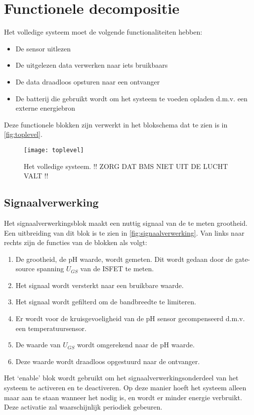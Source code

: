 \section{Functionele decompositie}
Het volledige systeem moet de volgende functionaliteiten hebben:

\begin{itemize}
    \item De sensor uitlezen
    \item De uitgelezen data verwerken naar iets bruikbaars
    \item De data draadloos opsturen naar een ontvanger
    \item De batterij die gebruikt wordt om het systeem te voeden opladen d.m.v. een externe energiebron
\end{itemize}
Deze functionele blokken zijn verwerkt in het blokschema dat te zien is in \autoref{fig:toplevel}.

\begin{figure}[ht]
    \centering
    \texttt{[image: toplevel]}
    \caption{Het volledige systeem. !! ZORG DAT BMS NIET UIT DE LUCHT VALT !!} 
    \label{fig:toplevel}
\end{figure}

\subsection{Signaalverwerking}
Het signaalverwerkingsblok maakt een nuttig signaal van de te meten grootheid. Een uitbreiding van dit blok is te zien in \autoref{fig:signaalverwerking}.
Van links naar rechts zijn de functies van de blokken als volgt:
\begin{enumerate}
    \item De grootheid, de pH waarde, wordt gemeten. Dit wordt gedaan door de gate-source spanning $U_{GS}$ van de ISFET te meten.
    \item Het signaal wordt versterkt naar een bruikbare waarde.
    \item Het signaal wordt gefilterd om de bandbreedte te limiteren.
    \item Er wordt voor de kruisgevoeligheid van de pH sensor gecompenseerd d.m.v. een temperatuursensor.
    \item De waarde van $U_{GS}$ wordt omgerekend naar de pH waarde.
    \item Deze waarde wordt draadloos opgestuurd naar de ontvanger.
\end{enumerate}
Het `enable' blok wordt gebruikt om het signaalverwerkingsonderdeel van het systeem te activeren en te deactiveren. Op deze manier hoeft het systeem alleen maar aan te staan wanneer het nodig is, en wordt er minder energie verbruikt. Deze activatie zal waarschijnlijk periodiek gebeuren.

